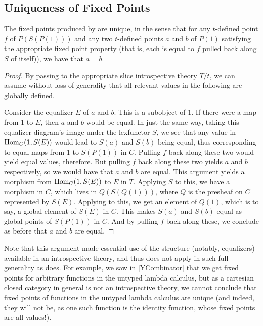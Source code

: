 \subsection{Uniqueness of Fixed Points}

\begin{theorem}\label{UniqueFixedPoints}
The fixed points produced by  are unique, in the sense that for any $t$-defined point $f$ of $P(S(P(1)))$ and any two $t$-defined points $a$ and $b$ of $P(1)$ satisfying the appropriate fixed point property (that is, each is equal to $f$ pulled back along $S$ of itself)), we have that $a = b$.
\end{theorem}
\begin{proof}
By passing to the appropriate slice introspective theory $T/t$, we can assume without loss of generality that all relevant values in the following are globally defined. 

Consider the equalizer $E$ of $a$ and $b$. This is a subobject of $1$. If there were a map from $1$ to $E$, then $a$ and $b$ would be equal. In just the same way, taking this equalizer diagram's image under the lexfunctor $S$, we see that any value in $\operatorname{Hom}_C(1, S(E))$ would lead to $S(a)$ and $S(b)$ being equal, thus corresponding to equal maps from $1$ to $S(P(1))$ in $C$. Pulling $f$ back along these two would yield equal values, therefore. But pulling $f$ back along these two yields $a$ and $b$ respectively, so we would have that $a$ and $b$ are equal. This argument yields a morphism from $\operatorname{Hom}_C(1, S(E))$ to $E$ in $T$. Applying $S$ to this, we have a morphism in $C$, which lives in $Q(S(Q(1)))$, where $Q$ is the presheaf on $C$ represented by $S(E)$. Applying  to this, we get an element of $Q(1)$, which is to say, a global element of $S(E)$ in $C$. This makes $S(a)$ and $S(b)$ equal as global points of $S(P(1))$ in $C$. And by pulling $f$ back along these, we conclude as before that $a$ and $b$ are equal. 
\end{proof}

\begin{observation}
Note that this argument made essential use of the structure (notably, equalizers) available in an introspective theory, and thus does not apply in such full generality as  does. For example, we saw in \cref{YCombinator} that we get fixed points for arbitrary functions in the untyped lambda calculus, but as a cartesian closed category in general is not an introspective theory, we cannot conclude that fixed points of functions in the untyped lambda calculus are unique (and indeed, they will not be, as one such function is the identity function, whose fixed points are all values!).
\end{observation}


